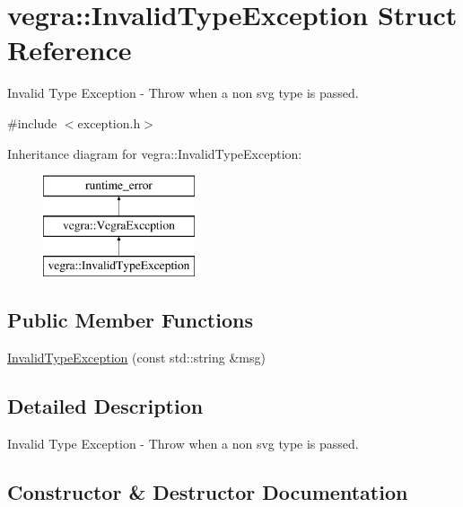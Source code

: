 \hypertarget{structvegra_1_1InvalidTypeException}{}\section{vegra\+:\+:Invalid\+Type\+Exception Struct Reference}
\label{structvegra_1_1InvalidTypeException}


Invalid Type Exception -\/ Throw when a non svg type is passed.  




{\ttfamily \#include $<$exception.\+h$>$}

Inheritance diagram for vegra\+:\+:Invalid\+Type\+Exception\+:\begin{figure}[H]
\begin{center}
\leavevmode
\includegraphics[height=3.000000cm]{structvegra_1_1InvalidTypeException}
\end{center}
\end{figure}
\subsection*{Public Member Functions}
\begin{DoxyCompactItemize}
\item 
\mbox{\hyperlink{structvegra_1_1InvalidTypeException_a302b895279c85376f3370a6734b029f5}{Invalid\+Type\+Exception}} (const std\+::string \&msg)
\end{DoxyCompactItemize}


\subsection{Detailed Description}
Invalid Type Exception -\/ Throw when a non svg type is passed. 

\subsection{Constructor \& Destructor Documentation}
\mbox{\label{structvegra_1_1InvalidTypeException_a302b895279c85376f3370a6734b029f5}} 
